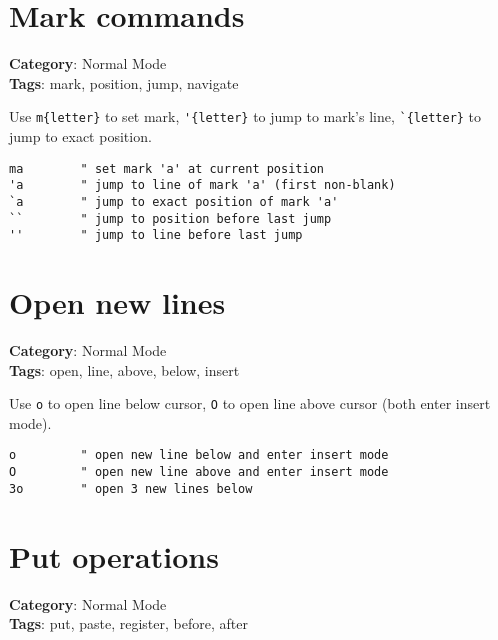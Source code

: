 {{{{{{{{{{\section{Mark commands}

\textbf{Category}: Normal Mode\\ \textbf{Tags}: mark, position, jump, navigate
\vspace{0.5cm}

Use {\footnotesize \Verb§m{letter}§} to set mark, {\footnotesize \Verb§'{letter}§} to jump to mark's line, {\footnotesize \Verb§`{letter}§} to jump to exact position.

\begin{Exa*}{}
\begin{Verbatim}[fontsize=\footnotesize, breaklines, breakanywhere]
ma        " set mark 'a' at current position
'a        " jump to line of mark 'a' (first non-blank)
`a        " jump to exact position of mark 'a'
``        " jump to position before last jump
''        " jump to line before last jump
\end{Verbatim}
\end{Exa*}

\section{Open new lines}

\textbf{Category}: Normal Mode\\ \textbf{Tags}: open, line, above, below, insert
\vspace{0.5cm}

Use {\footnotesize \Verb§o§} to open line below cursor, {\footnotesize \Verb§O§} to open line above cursor (both enter insert mode).

\begin{Exa*}{}
\begin{Verbatim}[fontsize=\footnotesize, breaklines, breakanywhere]
o         " open new line below and enter insert mode
O         " open new line above and enter insert mode
3o        " open 3 new lines below
\end{Verbatim}
\end{Exa*}

\section{Put operations}

\textbf{Category}: Normal Mode\\ \textbf{Tags}: put, paste, register, before, after
\vspace{0.5cm}

}}}}}}}}}}
